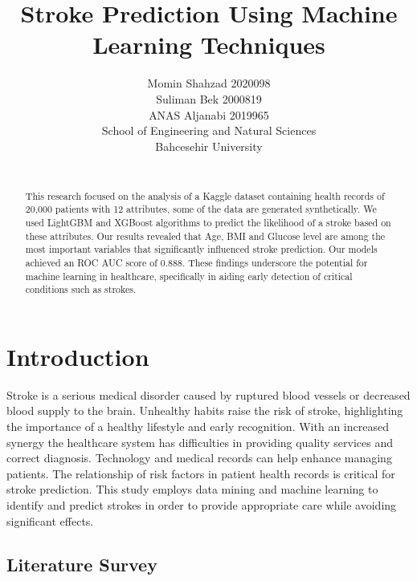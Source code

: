 \documentclass{article}
\title{Stroke Prediction Using Machine Learning Techniques}
\author{
 Momin Shahzad 2020098 \\ Suliman Bek 2000819 \\ ANAS Aljanabi 2019965 \\
  School of Engineering and Natural Sciences \\
  Bahcesehir University\\
   \\
}
\begin{document}
\maketitle


\begin{abstract}
   
This research focused on the analysis of a Kaggle dataset containing health records of 20,000 patients with 12 attributes, some of the data are generated synthetically. We used LightGBM and XGBoost algorithms to predict the likelihood of a stroke based on these attributes. Our results revealed that Age, BMI and Glucose level are among the most important variables that significantly influenced stroke prediction. Our models achieved an ROC AUC score of 0.888. These findings underscore the potential for machine learning in healthcare, specifically in aiding early detection of critical conditions such as strokes.
\end{abstract}


\section{Introduction}

Stroke is a serious medical disorder caused by ruptured blood vessels or decreased blood supply to the brain. Unhealthy habits raise the risk of stroke, highlighting the importance of a healthy lifestyle and early recognition. With an increased synergy the healthcare system has difficulties in providing quality services and correct diagnosis. Technology and medical records can help enhance managing patients. The relationship of risk factors in patient health records is critical for stroke prediction. This study employs data mining and machine learning to identify and predict strokes in order to provide appropriate care while avoiding significant effects.

\subsection{Literature Survey}
\end{document}
